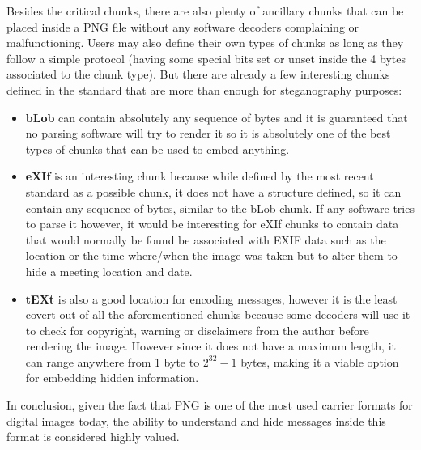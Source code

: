 \begin{multicols*}{2}
Besides the critical chunks, there are also plenty of ancillary chunks that can be placed inside a PNG file without any software decoders complaining or malfunctioning. Users may also define their own types of chunks as long as they follow a simple protocol (having some special bits set or unset inside the 4 bytes associated to the chunk type). But there are already a few interesting chunks defined in the standard that are more than enough for steganography purposes:
\begin{itemize}
	\item \textbf{bLob} can contain absolutely any sequence of bytes and it is guaranteed that no parsing software will try to render it so it is absolutely one of the best types of chunks that can be used to embed anything.
	\item \textbf{eXIf} is an interesting chunk because while defined by the most recent standard as a possible chunk, it does not have a structure defined, so it can contain any sequence of bytes, similar to the bLob chunk. If any software tries to parse it however, it would be interesting for eXIf chunks to contain data that would normally be found be associated with EXIF data such as the location or the time where/when the image was taken but to alter them to hide a meeting location and date.
	\item \textbf{tEXt} is also a good location for encoding messages, however it is the least covert out of all the aforementioned chunks because some decoders will use it to check for copyright, warning or disclaimers from the author before rendering the image. However since it does not have a maximum length, it can range anywhere from 1 byte to $2^{32}-1$ bytes, making it a viable option for embedding hidden information.
\end{itemize}

In conclusion, given the fact that PNG is one of the most used carrier formats for digital images today, the ability to understand and hide messages inside this format is considered highly valued.
\end{multicols*}
